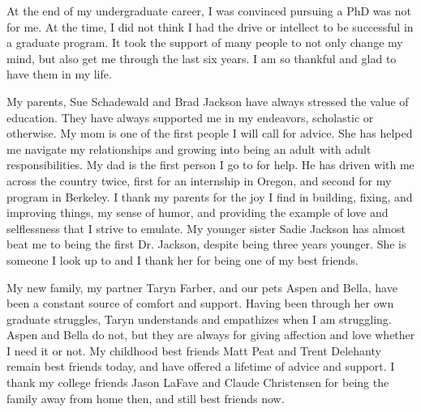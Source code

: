 
\begin{acknowledgements}
At the end of my undergraduate career, I was convinced pursuing a PhD was not for me. At the time, I did not think I had the drive or intellect to be successful in a graduate program. 
It took the support of many people to not only change my mind, but also get me through the last six years. 
I am so thankful and glad to have them in my life.

My parents, Sue Schadewald and Brad Jackson have always stressed the value of education. They have always supported me in my endeavors, scholastic or otherwise.
My mom is one of the first people I will call for advice.
She has helped me navigate my relationships and growing into being an adult with adult responsibilities.
My dad is the first person I go to for help. He has driven with me across the country twice, first for an internship in Oregon, and second for my program in Berkeley.
I thank my parents for the joy I find in building, fixing, and improving things, my sense of humor, and providing the example of love and selflessness that I strive to emulate.
My younger sister Sadie Jackson has almost beat me to being the first Dr. Jackson, despite being three years younger. 
She is someone I look up to and I thank her for being one of my best friends. 

My new family, my partner Taryn Farber, and our pets Aspen and Bella, have been a constant source of comfort and support.
Having been through her own graduate struggles, Taryn understands and empathizes when I am struggling.
Aspen and Bella do not, but they are always for giving affection and love whether I need it or not.
My childhood best friends Matt Peat and Trent Delehanty remain best friends today, and have offered a lifetime of advice and support.
I thank my college friends Jason LaFave and Claude Christensen for being the family away from home then, and still best friends now.


\end{acknowledgements}
